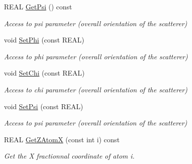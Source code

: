 \begin{DoxyCompactItemize}
\mbox{\label{class_obj_cryst_1_1_z_scatterer_a8856ea3c6246d4bec7f671586f5fc863}} 
R\+E\+AL \mbox{\hyperlink{class_obj_cryst_1_1_z_scatterer_a8856ea3c6246d4bec7f671586f5fc863}{Get\+Psi}} () const
\begin{DoxyCompactList}\small\item\em Access to psi parameter (overall orientation of the scatterer) \end{DoxyCompactList}\item 
\mbox{\label{class_obj_cryst_1_1_z_scatterer_a887dbc07697df53f50fe4546563c8a07}} 
void \mbox{\hyperlink{class_obj_cryst_1_1_z_scatterer_a887dbc07697df53f50fe4546563c8a07}{Set\+Phi}} (const R\+E\+AL)
\begin{DoxyCompactList}\small\item\em Access to phi parameter (overall orientation of the scatterer) \end{DoxyCompactList}\item 
\mbox{\label{class_obj_cryst_1_1_z_scatterer_ac1cced93f67978157b93ae72b3fba644}} 
void \mbox{\hyperlink{class_obj_cryst_1_1_z_scatterer_ac1cced93f67978157b93ae72b3fba644}{Set\+Chi}} (const R\+E\+AL)
\begin{DoxyCompactList}\small\item\em Access to chi parameter (overall orientation of the scatterer) \end{DoxyCompactList}\item 
\mbox{\label{class_obj_cryst_1_1_z_scatterer_aeb0b5e2ceae975ef762857659cb30fbd}} 
void \mbox{\hyperlink{class_obj_cryst_1_1_z_scatterer_aeb0b5e2ceae975ef762857659cb30fbd}{Set\+Psi}} (const R\+E\+AL)
\begin{DoxyCompactList}\small\item\em Access to psi parameter (overall orientation of the scatterer) \end{DoxyCompactList}\item 
\mbox{\label{class_obj_cryst_1_1_z_scatterer_a10481ea0bd711b3097b8cc931fce7eee}} 
R\+E\+AL \mbox{\hyperlink{class_obj_cryst_1_1_z_scatterer_a10481ea0bd711b3097b8cc931fce7eee}{Get\+Z\+AtomX}} (const int i) const
\begin{DoxyCompactList}\small\item\em Get the X fractionnal coordinate of atom i. \end{DoxyCompactList}\item 

\end{DoxyCompactItemize}
